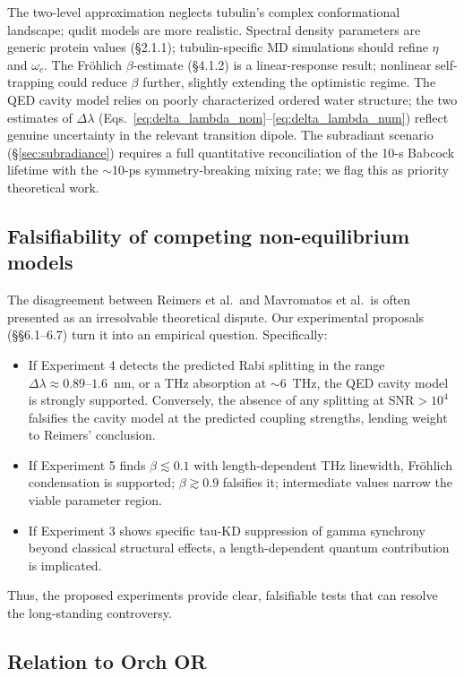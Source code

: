 \documentclass[twocolumn,10pt]{article}
\begin{document}
The two-level approximation neglects tubulin's complex conformational
landscape; qudit models \cite{Mavromatos2025} are more realistic. Spectral
density parameters are generic protein values (\S 2.1.1); tubulin-specific
MD simulations should refine $\eta$ and $\omega_c$. The Fr\"ohlich
$\beta$-estimate (\S 4.1.2) is a linear-response result; nonlinear
self-trapping could reduce $\beta$ further, slightly extending the
optimistic regime. The QED cavity model relies on poorly characterized
ordered water structure; the two estimates of $\Delta\lambda$
(Eqs.~\ref{eq:delta_lambda_nom}--\ref{eq:delta_lambda_num}) reflect
genuine uncertainty in the relevant transition dipole. The subradiant
scenario (\S\ref{sec:subradiance}) requires a full quantitative
reconciliation of the 10-s Babcock lifetime with the
$\sim$10-ps symmetry-breaking mixing rate; we flag this as priority
theoretical work.


\subsection{Falsifiability of competing non-equilibrium models}

The disagreement between Reimers et al.\ and Mavromatos et al.\ is often
presented as an irresolvable theoretical dispute. Our experimental
proposals (\S\S 6.1--6.7) turn it into an empirical question.
Specifically:
\begin{itemize}
    \item If Experiment 4 detects the predicted Rabi splitting in the
range $\Delta\lambda \approx 0.89\text{--}1.6$~nm, or a THz absorption at
$\sim 6$~THz, the QED cavity model is strongly supported. Conversely, the
absence of any splitting at SNR$>10^4$ falsifies the cavity model at the
predicted coupling strengths, lending weight to Reimers' conclusion.
    \item If Experiment 5 finds $\beta\lesssim 0.1$ with length-dependent
THz linewidth, Fr\"ohlich condensation is supported; $\beta\gtrsim 0.9$
falsifies it; intermediate values narrow the viable parameter region.
    \item If Experiment 3 shows specific tau-KD suppression of gamma
synchrony beyond classical structural effects, a length-dependent
quantum contribution is implicated.
\end{itemize}
Thus, the proposed experiments provide clear, falsifiable tests that
can resolve the long-standing controversy.


\subsection{Relation to Orch OR}
\end{document}
